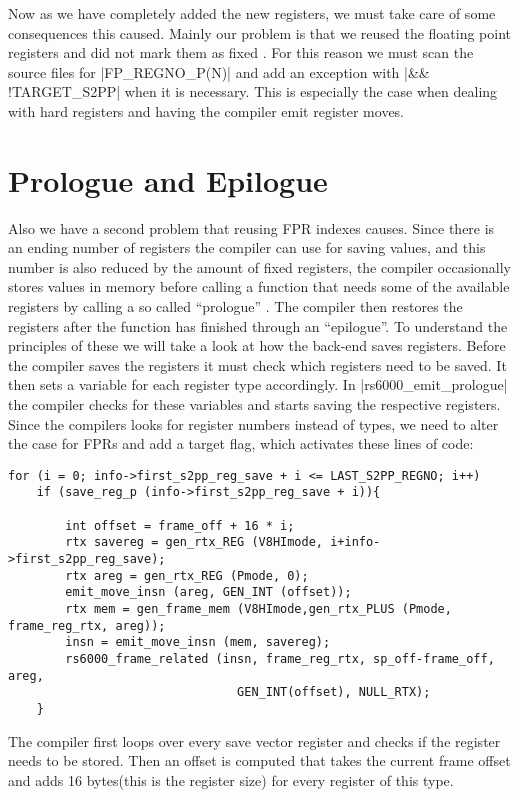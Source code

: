 Now as we have completely added the new registers, we must take care of some consequences this caused.
Mainly our problem is that we reused the floating point registers and did not mark them as fixed .
For this reason we must scan the source files for |FP_REGNO_P(N)| and add an exception with |&& !TARGET_S2PP| when it is necessary.
This is especially the case when dealing with hard registers and having the compiler emit register moves.

\section{Prologue and Epilogue}
Also we have a second problem that reusing FPR indexes causes.
Since there is an ending number of registers the compiler can use for saving values, and this number is also reduced by the amount of fixed registers, the compiler occasionally stores values in memory before calling a function that needs some of the available registers by calling a so called ``prologue'' \citep{GCCint:funcentry}.
The compiler then restores the registers after the function has finished through an ``epilogue''.
To understand the principles of these we will take a look at how the back-end saves registers.
Before the compiler saves the registers it must check which registers need to be saved.
It then sets a variable for each register type accordingly.
In |rs6000_emit_prologue| the compiler checks for these variables and starts saving the respective registers.
Since the compilers looks for register numbers instead of types, we need to alter the case for FPRs and add a target flag, which activates these lines of code:
\begin{lstlisting}
for (i = 0; info->first_s2pp_reg_save + i <= LAST_S2PP_REGNO; i++)
    if (save_reg_p (info->first_s2pp_reg_save + i)){

        int offset = frame_off + 16 * i;
        rtx savereg = gen_rtx_REG (V8HImode, i+info->first_s2pp_reg_save);
        rtx areg = gen_rtx_REG (Pmode, 0);
        emit_move_insn (areg, GEN_INT (offset));
        rtx mem = gen_frame_mem (V8HImode,gen_rtx_PLUS (Pmode, frame_reg_rtx, areg));
        insn = emit_move_insn (mem, savereg);
        rs6000_frame_related (insn, frame_reg_rtx, sp_off-frame_off, areg,
                                GEN_INT(offset), NULL_RTX);
    }
\end{lstlisting}
The compiler first loops over every save vector register and checks if the register needs to be stored.
Then an offset is computed that takes the current frame offset and adds 16 bytes(this is the register size) for every register of this type.
